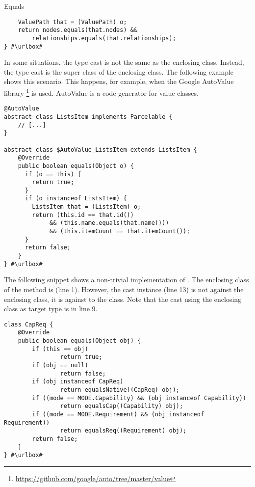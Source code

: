 \begin{pattern}{Equals}
\begin{verbatim}
    ValuePath that = (ValuePath) o;
    return nodes.equals(that.nodes) &&
        relationships.equals(that.relationships);
} #\urlbox#
\end{verbatim}

In some situations, the type cast is not the same as the enclosing class.
Instead, the type cast is the super class of the enclosing class.
The following example shows this scenario.
This happens, for example, when the Google AutoValue library%
\footnote{\url{https://github.com/google/auto/tree/master/value}}
is used.
AutoValue is a code generator for value classes.

\def\urlvar{http://bit.ly/square_sqlbrite_2HmHMYE}
\begin{verbatim}
@AutoValue
abstract class ListsItem implements Parcelable {
    // [...]
}

abstract class $AutoValue_ListsItem extends ListsItem {
    @Override
    public boolean equals(Object o) {
      if (o == this) {
        return true;
      }
      if (o instanceof ListsItem) {
        ListsItem that = (ListsItem) o;
        return (this.id == that.id())
             && (this.name.equals(that.name()))
             && (this.itemCount == that.itemCount());
      }
      return false;
    }
} #\urlbox#
\end{verbatim}

The following snippet shows a non-trivial implementation of .
The enclosing class of the  method is  (line 1).
However, the cast instance (line 13) is not against the enclosing class,
it is against to the  class.
Note that the cast using the enclosing class as target type is in line 9.

\def\urlvar{http://bit.ly/bndtools_bnd_2SM5pOw}
\begin{verbatim}
class CapReq {
    @Override
    public boolean equals(Object obj) {
        if (this == obj)
                return true;
        if (obj == null)
                return false;
        if (obj instanceof CapReq)
                return equalsNative((CapReq) obj);
        if ((mode == MODE.Capability) && (obj instanceof Capability))
                return equalsCap((Capability) obj);
        if ((mode == MODE.Requirement) && (obj instanceof Requirement))
                return equalsReq((Requirement) obj);
        return false;
    }
} #\urlbox#
\end{verbatim}



\end{pattern}
